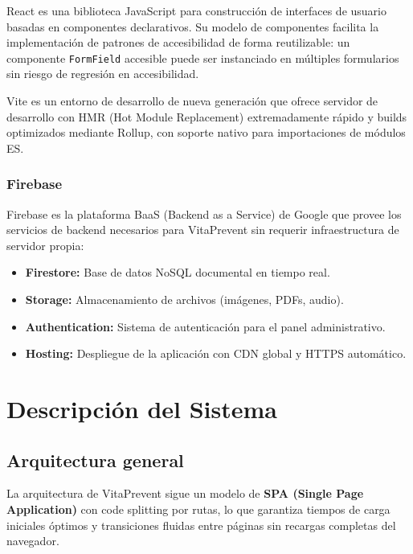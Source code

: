 \documentclass[12pt, a4paper]{report}
\begin{document}
React es una biblioteca JavaScript para construcción de interfaces de usuario basadas en componentes declarativos. Su modelo de componentes facilita la implementación de patrones de accesibilidad de forma reutilizable: un componente \texttt{FormField} accesible puede ser instanciado en múltiples formularios sin riesgo de regresión en accesibilidad.

Vite es un entorno de desarrollo de nueva generación que ofrece servidor de desarrollo con HMR (Hot Module Replacement) extremadamente rápido y builds optimizados mediante Rollup, con soporte nativo para importaciones de módulos ES.

\subsection{Firebase}

Firebase es la plataforma BaaS (Backend as a Service) de Google que provee los servicios de backend necesarios para VitaPrevent sin requerir infraestructura de servidor propia:

\begin{itemize}
  \item \textbf{Firestore:} Base de datos NoSQL documental en tiempo real.
  \item \textbf{Storage:} Almacenamiento de archivos (imágenes, PDFs, audio).
  \item \textbf{Authentication:} Sistema de autenticación para el panel administrativo.
  \item \textbf{Hosting:} Despliegue de la aplicación con CDN global y HTTPS automático.
\end{itemize}

\chapter{Descripción del Sistema}

\section{Arquitectura general}

La arquitectura de VitaPrevent sigue un modelo de \textbf{SPA (Single Page Application)} con code splitting por rutas, lo que garantiza tiempos de carga iniciales óptimos y transiciones fluidas entre páginas sin recargas completas del navegador.
\end{document}
